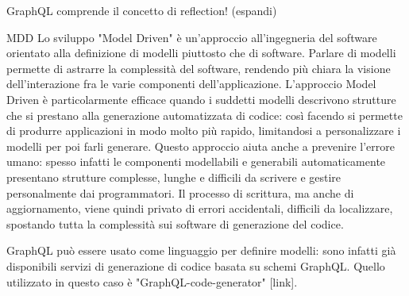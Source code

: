         GraphQL comprende il concetto di reflection! (espandi)


    
    MDD
        Lo sviluppo "Model Driven" è un'approccio all'ingegneria del software orientato alla definizione di modelli piuttosto che di software.
        Parlare di modelli permette di astrarre la complessità del software, rendendo più chiara la visione dell'interazione fra le varie componenti dell'applicazione.
        L'approccio Model Driven è particolarmente efficace quando i suddetti modelli descrivono strutture che si prestano alla generazione automatizzata di codice: così facendo si permette di produrre applicazioni in modo molto più rapido, limitandosi a personalizzare
        i modelli per poi farli generare.
        Questo approccio aiuta anche a prevenire l'errore umano: spesso infatti le componenti modellabili e generabili automaticamente presentano strutture complesse, lunghe e difficili da scrivere e gestire personalmente dai programmatori.
        Il processo di scrittura, ma anche di aggiornamento, viene quindi privato di errori accidentali, difficili da localizzare, spostando tutta la complessità sui software di generazione del codice.

        GraphQL può essere usato come linguaggio per definire modelli: sono infatti già disponibili servizi di generazione di codice basata su schemi GraphQL.
        Quello utilizzato in questo caso è "GraphQL-code-generator" [link].


